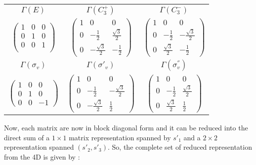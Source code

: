 \documentclass[a4paper, 12pt, openany]{report}
\begin{document}
 \begin{table}[H]
 	\begin{tabular}{ccc}$\Gamma(E)$ & $\Gamma(C_3^+)$ & 
 		$\Gamma(C_3^-)$ \\
 			$\begin{pmatrix}
 		1&0&0\\0&1&0\\0&0&1\\\end{pmatrix}$&$\begin{pmatrix}
 	1&0&0\\0&-\frac{1}{2}&\frac{\sqrt{3}}{2}\\0&-{\frac{\sqrt{3}}{2}}&-\frac{1}{2}\end{pmatrix}$&$\begin{pmatrix}
 		1&0&0\\0&-\frac{1}{2}&-\frac{\sqrt{3}}{2}\\0&\frac{\sqrt{3}}{2}&-\frac{1}{2}\end{pmatrix}$\\\linebreak[5cm]$ \Gamma(\sigma_v)$& $\Gamma(\sigma'_v)$&$ \Gamma(\sigma_v^{''})$\\	$\begin{pmatrix}
 		1&0&0\\0&1&0\\0&0&-1\end{pmatrix}
 		$&$\begin{pmatrix}
 		1&0&0\\0&-\frac{1}{2}&-\frac{\sqrt{3}}{2}\\0&-{\frac{\sqrt{3}}{2}}&\frac{1}{2}\end{pmatrix}
 		$&$ \begin{pmatrix}
 		1&0&0\\0&-\frac{1}{2}&\frac{\sqrt{3}}{2}\\0&{\frac{\sqrt{3}}{2}}&\frac{1}{2}\end{pmatrix}$
 \end{tabular}\end{table}
 Now, each matrix are now in block diagonal form and it can be reduced into the direct sum of a $1\times1$ matrix representation spanned by $s'_1$ and a $2\times2$ representation spanned $(s'_2, s'_3)$. So, the complete set of reduced representation from the 4D is given by :
 
\end{document}
